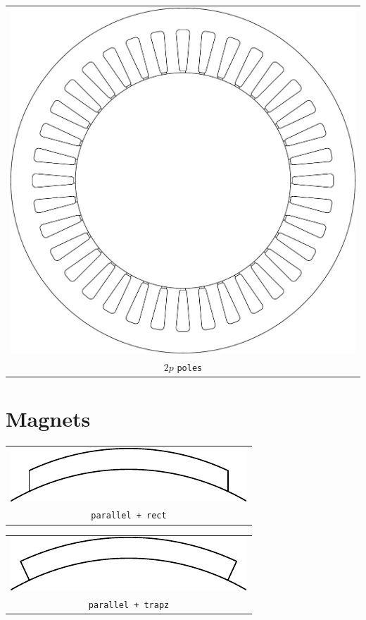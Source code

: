 \documentclass[a4paper,11pt,oneside]{report}
\begin{document}
\begin{tabular}{c}
\includegraphics[scale=0.75]{../SPM/examples/stators/2ppole}
 
\\
$ 2p $ \texttt{poles}
\end{tabular}



\newpage
\section{Magnets}

\begin{tabular}{c}
\includegraphics[scale=1]{../SPM/examples/magnets/parallel_rect}
\\
\texttt{parallel + rect}
\end{tabular}
\vspace{5mm}

\noindent
\begin{tabular}{c}
\includegraphics[scale=1]{../SPM/examples/magnets/parallel_trapz}
\\
\texttt{parallel + trapz}
\end{tabular}
\vspace{5mm}
\end{document}
